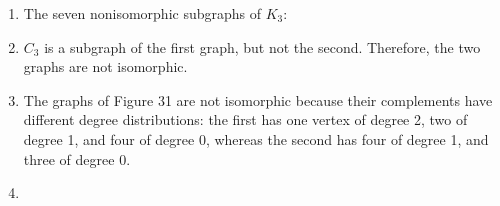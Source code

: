 \documentclass[nobib]{tufte-book}
\begin{document}
\begin{enumerate}
    \item The seven nonisomorphic subgraphs of $K_{3}$:
      \begin{figure}
      \end{figure}

    \item $C_{3}$ is a subgraph of the first graph, but not the
      second. Therefore, the two graphs are not isomorphic.

    \item The graphs of Figure 31 are not isomorphic because their complements
      have different degree distributions: the first has one vertex of degree 2,
      two of degree 1, and four of degree 0, whereas the second has four of
      degree 1, and three of degree 0.
      \begin{marginfigure}[-5em]
      \end{marginfigure}

    \item {}

\end{enumerate}

\backmatter

\printglossaries
\end{document}
